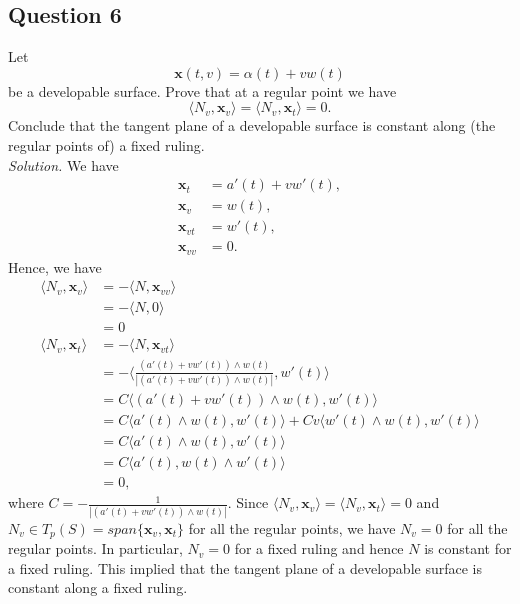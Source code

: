 \documentclass[12pt]{article}
\begin{document}
\subsection*{Question 6}
Let\begin{equation*}
    \mathbf{x}(t,v) = \alpha(t) + vw(t)
\end{equation*}
be a developable surface. Prove that at a regular point we have\begin{equation*}
    \langle N_v,\mathbf{x}_v\rangle = \langle N_v,\mathbf{x}_t\rangle = 0.
\end{equation*}
Conclude that the tangent plane of a developable surface is constant along (the regular points of) a fixed ruling.\\

\textit{Solution.} We have \begin{align*}
    \mathbf{x}_t &= a'(t) + vw'(t),\\
    \mathbf{x}_v &= w(t),\\
    \mathbf{x}_{vt} &= w'(t),\\
    \mathbf{x}_{vv} &= 0.
\end{align*}
Hence, we have \begin{align*}
    \langle N_v,\mathbf{x}_v \rangle &= -\langle N,\mathbf{x}_{vv} \rangle\\
    &= -\langle N,0 \rangle\\
    &= 0\\
    \langle N_v,\mathbf{x}_t \rangle &= -\langle N,\mathbf{x}_{vt} \rangle\\
    &= -\langle \frac{(a'(t) + vw'(t))\wedge w(t)}{|(a'(t) + vw'(t))\wedge w(t)|},w'(t) \rangle\\
    &= C\langle(a'(t) + vw'(t))\wedge w(t),w'(t) \rangle\\
    &= C\langle a'(t)\wedge w(t),w'(t) \rangle + Cv\langle w'(t)\wedge w(t),w'(t) \rangle\\
    &= C\langle a'(t)\wedge w(t),w'(t) \rangle\\
    &= C\langle a'(t), w(t)\wedge w'(t) \rangle\\
    &= 0,
\end{align*}
where $C = -\frac{1}{|(a'(t) + vw'(t))\wedge w(t)|}$. Since $\langle N_v,\mathbf{x}_v\rangle = \langle N_v,\mathbf{x}_t\rangle = 0$ and $N_v \in T_p(S) = span\{\mathbf{x}_v,\mathbf{x}_t\}$ for all the regular points, we have $N_v = 0$ for all the regular points. In particular, $N_v=0$ for a fixed ruling and hence $N$ is constant for a fixed ruling. This implied that the tangent plane of a developable surface is constant along a fixed ruling.
\end{document}

